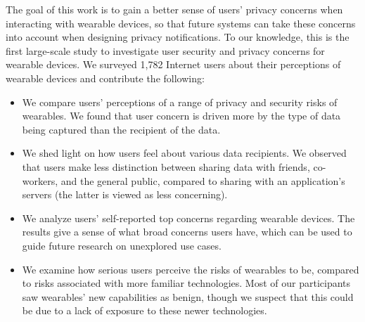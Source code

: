 The goal of this work is to gain a better sense of users' privacy concerns when interacting with wearable devices, so that future systems can take these concerns into account when designing privacy notifications. To our knowledge, this is the first large-scale study to investigate user security and privacy concerns for wearable devices. We surveyed 1,782 Internet users about their perceptions of wearable devices and contribute the following: %

\begin{itemize} \itemsep1pt \parskip0pt 
\item We compare users' perceptions of a range of privacy and security risks of wearables. We found that user concern is driven more by the type of data being captured than the recipient of the data.
\item We shed light on how users feel about various data recipients. We observed that users make less distinction between sharing data with friends, co-workers, and the general public, compared to sharing with an application's servers (the latter is viewed as less concerning).
\item We analyze users' self-reported top concerns regarding wearable devices. The results give a sense of what broad concerns users have, which can be used to guide future research on unexplored use cases. 
\item We examine how serious users perceive the risks of wearables to be, compared to risks associated with more familiar technologies. Most of our participants saw wearables' new capabilities as benign, though we suspect that this could be due to a lack of exposure to these newer technologies.
\end{itemize}
